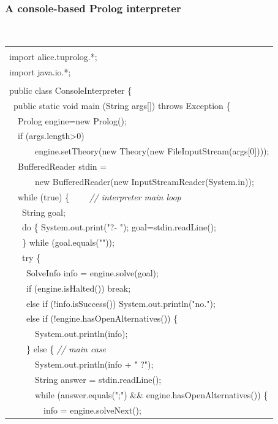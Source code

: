 \subsubsection{A console-based Prolog interpreter}

\begin{table}
    \small
    \begin{center}{\tt
    \begin{tabular}{p{14cm}}\hline\\
    import alice.tuprolog.*;\\
    import java.io.*;\\
    \\
    public class ConsoleInterpreter  \{\\
    ~public static void main (String args[]) throws Exception \{\\
    ~~Prolog engine=new Prolog();\\
    ~~if (args.length>0)\\
    ~~~~~~engine.setTheory(new Theory(new FileInputStream(args[0])));\\
    ~~BufferedReader stdin =\\
    ~~~~~~new BufferedReader(new InputStreamReader(System.in));\\
    ~~while (true) \{ \textit{~~~~// interpreter main loop} \\
    ~~~String goal;\\
    ~~~do \{ System.out.print("?- "); goal=stdin.readLine();\\
    ~~~\} while (goal.equals(""));\\
    ~~~try \{\\
    ~~~~SolveInfo info = engine.solve(goal);\\
    ~~~~if (engine.isHalted()) break;\\
    ~~~~else if (!info.isSuccess()) System.out.println("no.");\\
    ~~~~else if (!engine.hasOpenAlternatives()) \{\\
    ~~~~~~System.out.println(info);\\
    ~~~~\} else \{ \textit{// main case}\\
    ~~~~~~System.out.println(info + " ?");\\
    ~~~~~~String answer = stdin.readLine();\\
    ~~~~~~while (answer.equals(";") \&\& engine.hasOpenAlternatives())
    \{\\
    ~~~~~~~~info = engine.solveNext();\\

\end{tabular}}
\end{center}
\end{table}
